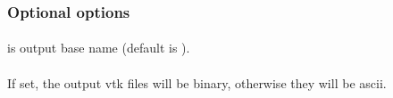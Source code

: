 \subsubsection{Optional options}
\paragraph{}
 is output base name (default is ).
\paragraph{}
If set, the output vtk files will be binary, otherwise they will be ascii.
%
%
